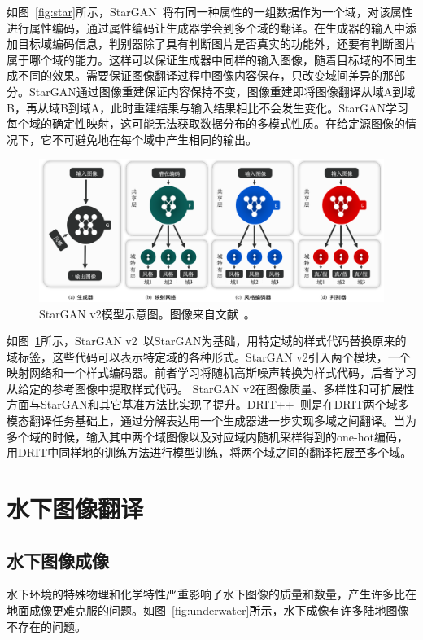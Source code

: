 如图~\ref{fig:star}所示，StarGAN~\cite{choi2018stargan}将有同一种属性的一组数据作为一个域，对该属性进行属性编码，通过属性编码让生成器学会到多个域的翻译。在生成器的输入中添加目标域编码信息，判别器除了具有判断图片是否真实的功能外，还要有判断图片属于哪个域的能力。这样可以保证生成器中同样的输入图像，随着目标域的不同生成不同的效果。需要保证图像翻译过程中图像内容保存，只改变域间差异的那部分。StarGAN通过图像重建保证内容保持不变，图像重建即将图像翻译从域A到域B，再从域B到域A，此时重建结果与输入结果相比不会发生变化。StarGAN学习每个域的确定性映射，这可能无法获取数据分布的多模式性质。在给定源图像的情况下，它不可避免地在每个域中产生相同的输出。

\begin{figure}[ht]
    \centering
	\includegraphics[width=\textwidth]{figures/starv2.png}
	\caption{StarGAN v2模型示意图。图像来自文献~\cite{choi2020stargan}。}
	\label{fig:starv2}
\end{figure}

如图~\ref{fig:starv2}所示，StarGAN v2~\cite{choi2020stargan}以StarGAN为基础，用特定域的样式代码替换原来的域标签，这些代码可以表示特定域的各种形式。StarGAN v2引入两个模块，一个映射网络和一个样式编码器。前者学习将随机高斯噪声转换为样式代码，后者学习从给定的参考图像中提取样式代码。
StarGAN v2在图像质量、多样性和可扩展性方面与StarGAN和其它基准方法比实现了提升。DRIT++~\cite{lee2020drit++}则是在DRIT两个域多模态翻译任务基础上，通过分解表达用一个生成器进一步实现多域之间翻译。当为多个域的时候，输入其中两个域图像以及对应域内随机采样得到的one-hot编码，用DRIT中同样地的训练方法进行模型训练，将两个域之间的翻译拓展至多个域。

\section{水下图像翻译}\label{sec:underwater}
\subsection{水下图像成像}
水下环境的特殊物理和化学特性严重影响了水下图像的质量和数量，产生许多比在地面成像更难克服的问题。如图~\ref{fig:underwater}所示，水下成像有许多陆地图像不存在的问题。

